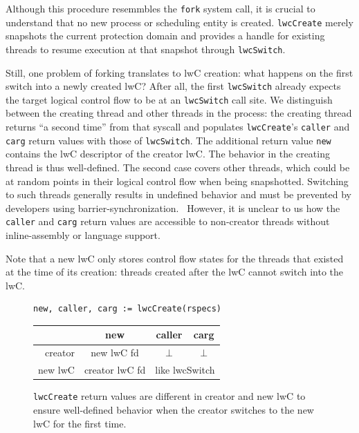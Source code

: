 \documentclass[10pt,twocolumn,a4paper]{article}
\begin{document}
Although this procedure resemmbles the \lstinline{fork} system call, it is crucial to understand that no new process or scheduling entity is created.
\lstinline{lwcCreate} merely snapshots the current protection domain and provides a handle for existing threads to resume execution at that snapshot through \lstinline{lwcSwitch}.

Still, one problem of forking translates to lwC creation:
what happens on the first switch into a newly created lwC?
After all, the first \lstinline{lwcSwitch} already expects the target logical control flow to be at an \lstinline{lwcSwitch} call site.
We distinguish between the creating thread and other threads in the process:
the creating thread returns \enquote{a second time} from that syscall and populates \lstinline{lwcCreate}'s \lstinline{caller} and \lstinline{carg} return values with those of \lstinline{lwcSwitch}.
The additional return value \lstinline{new} contains the lwC descriptor of the creator lwC.
The behavior in the creating thread is thus well-defined.
The second case covers other threads, which could be at random points in their logical control flow when being snapshotted.
Switching to such threads generally results in undefined behavior and must be prevented by developers using barrier-synchronization.~\cite{lwcpaper}
However, it is unclear to us how the \lstinline{caller} and \lstinline{carg} return values are accessible to non-creator threads without inline-assembly or language support.

Note that a new lwC only stores control flow states for the threads that existed at the time of its creation:
threads created after the lwC cannot switch into the lwC.

\vspace{1.5em}
\begin{figure}[h]
  \centering
  \begin{framed}
\begin{lstlisting}[mathescape,aboveskip=0pt]
  new, caller, carg := lwcCreate(rspecs)
\end{lstlisting}
\begin{tabular}{|r||c|c|c|}
  \hline
                &   new        & caller       & carg \\
  \hline\hline
  creator       & new lwC fd   & $\bot$      & $\bot$\\
  \hline
  new lwC       &    creator lwC fd   & \multicolumn{2}{c|}{like lwcSwitch}\\
  \hline
\end{tabular}
\end{framed}
\caption{
  \texttt{lwcCreate} return values are different in creator and new lwC to ensure well-defined behavior when the creator switches to the new lwC for the first time.
  \label{design:fig:lwcCreate}
}
\end{figure}
\end{document}
